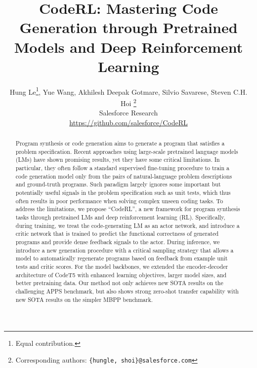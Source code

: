 \documentclass{article}
\title{
CodeRL: Mastering Code Generation through Pretrained Models and Deep Reinforcement Learning
}
\author{Hung Le\thanks{Equal contribution.},  Yue Wang\footnotemark[1],  Akhilesh Deepak Gotmare, Silvio Savarese, Steven C.H. Hoi
  \thanks{Corresponding authors: \texttt{\small \{hungle, shoi\}@salesforce.com}}
\\
  Salesforce Research\\
\url{https://github.com/salesforce/CodeRL}\vspace{-0.3in}
}
\begin{document}
\maketitle


\begin{abstract}

Program synthesis or code generation aims to generate a program that satisfies a problem specification. Recent approaches using large-scale pretrained language models (LMs) have shown promising results, yet they have some critical limitations. In particular, they often follow a standard supervised fine-tuning procedure to train a
code generation model only from the pairs of natural-language problem descriptions and ground-truth programs. Such paradigm largely ignores some important but potentially useful signals in the problem specification such as unit tests, 
which thus often results in poor performance when solving complex unseen coding tasks. To address the limitations, we propose ``CodeRL'', a new framework for program synthesis tasks through pretrained LMs and deep reinforcement learning (RL). Specifically, during training, we treat the code-generating LM as an actor network, and introduce a critic network that is trained to predict the functional correctness of generated programs and provide dense feedback signals to the actor. During inference, we introduce a new generation procedure with a critical sampling strategy that allows a model to automatically regenerate programs based on feedback from example unit tests and critic scores. For the model backbones, we extended the encoder-decoder architecture of CodeT5 with enhanced learning objectives, larger model sizes, and better pretraining data. Our method not only achieves new SOTA results on the challenging APPS benchmark, but also shows strong zero-shot transfer capability with new SOTA results on the simpler MBPP benchmark. 


\end{abstract}
\end{document}
